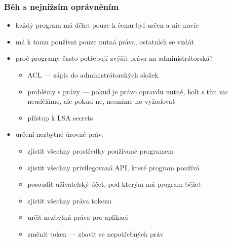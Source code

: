 \subsubsection*{Běh s nejnižsím oprávněním}
\begin{itemize}
    \item každý program má dělat pouze k čemu byl určen a nic navíc
    \item má k tomu používat pouze nutná práva, ostatních se vzdát
    \item proč programy často potřebují zvýšit práva na administrátorská?
    \begin{itemize}
        \item ACL --- zápis do administrátorských složek
        \item problémy s právy --- pokud je právo opravdu nutné, holt s tím nic neuděláme, ale pokud ne, nesmíme ho vyžadovat
        \item přístup k LSA secrets
    \end{itemize}
    \item určení nezbytné úrovně práv:
    \begin{itemize}
        \item zjistit všechny prostředky používané programem
        \item zjistit všechny privilegovaná API, které program používá
        \item posoudit uživatelský účet, pod kterým má program běžet
        \item zjistit všechny práva tokenu
        \item určit nezbytná práva pro aplikaci
        \item změnit token --- zbavit se nepotřebných práv
    \end{itemize}
\end{itemize}

